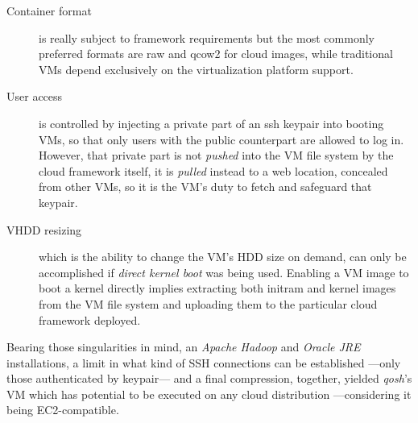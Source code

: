 \documentclass{sig-alternate}
\begin{document}
\begin{description}
 \item[Container format] is really subject to framework requirements but the most commonly preferred formats are raw and qcow2 for cloud images, while traditional VMs depend exclusively on the virtualization platform support.
 
 \item[User access] is controlled by injecting a private part of an ssh keypair into booting VMs, so that only users with the public counterpart are allowed to log in. However, that private part is not \emph{pushed} into the VM file system by the cloud framework itself, it is \emph{pulled} instead to a web location, concealed from other VMs, so it is the VM's duty to fetch and safeguard that keypair.
 
 \item[VHDD resizing] which is the ability to change the VM's HDD size on demand, can only be accomplished if \emph{direct kernel boot} was being used. Enabling a VM image to boot a kernel directly implies extracting both initram and kernel images from the VM file system and uploading them to the particular cloud framework deployed.
\end{description}

Bearing those singularities in mind, an \emph{Apache Hadoop} and \emph{Oracle JRE} installations, a limit in what kind of SSH connections can be established ---only those authenticated by keypair--- and a final compression, together, yielded \emph{qosh}'s VM \cite{ahvm:2013:online} which has potential to be executed on any cloud distribution ---considering it being EC2-compatible.

\end{document}
